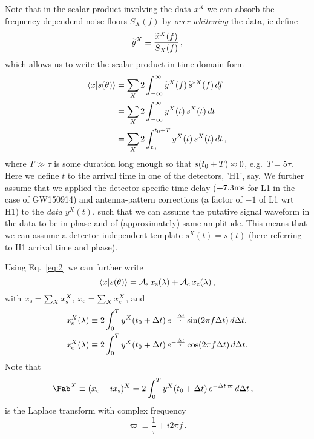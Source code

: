 \documentclass[aps,prd,onecolumn,nofootinbib,superscriptaddress,altaffilletter,floatfix]{revtex4-1}
\begin{document}
Note that in the scalar product involving the data $x^X$ we can absorb the frequency-dependend noise-floors $S_X(f)$ by \emph{over-whitening} the
data, ie define
\begin{equation}
  \label{eq:12}
  \widetilde{y}^X \equiv \frac{\widetilde{x}^X(f)}{S_X(f)}\,,
\end{equation}
which allows us to write the scalar product in time-domain form
\begin{align}
  \label{eq:13}
  \langle x|s(\theta)\rangle &= \sum_X 2\int_{-\infty}^{\infty} \widetilde{y}^X(f)\,\widetilde{s}^{*X}(f)\,df \\
  &= \sum_X 2\int_{-\infty}^{\infty} y^X(t)\,s^X(t)\,dt \\
  &= \sum_X 2\int_{t_0}^{t_0 + T} y^X(t)\,s^X(t)\,dt\,,
\end{align}
where $T \gg \tau$ is some duration long enough so that $s(t_0+T)\approx0$, e.g.\ $T=5\tau$. Here we define $t$ to the arrival time in one of
the detectors, 'H1', say. We further assume that we applied the detector-specific time-delay ($+7.3\mathrm{ms}$ for L1 in the case of GW150914) and
antenna-pattern corrections (a factor of $-1$ of L1 wrt H1) to the \emph{data} $y^X(t)$, such that we can assume the putative signal waveform in the
data to be in phase and of (approximately) same amplitude. This means that we can assume a detector-independent template $s^X(t) = s(t)$ (here
referring to H1 arrival time and phase).

Using Eq.~\eqref{eq:2} we can further write
\begin{equation}
  \label{eq:9}
  \langle x|s(\theta)\rangle = \mathcal{A}_{\mathrm{s}}\,x_{\mathrm{s}}(\lambda) + \mathcal{A}_{\mathrm{c}}\,x_{\mathrm{c}}(\lambda)\,,
\end{equation}
with $x_{\mathrm{s}}=\sum_X x_{\mathrm{s}}^X$, $x_{\mathrm{c}}=\sum_X x_{\mathrm{c}}^X$, and
\begin{align}
  \label{eq:10}
  x_{\mathrm{s}}^X(\lambda) &\equiv 2\int_{0}^{T} y^X(t_0+\Delta t)\,e^{-\frac{\Delta t}{\tau}}\sin(2\pi f\Delta t)\,d\Delta t,\\
  x_{\mathrm{c}}^X(\lambda) &\equiv 2\int_{0}^{T} y^X(t_0+\Delta t)\,e^{-\frac{\Delta t}{\tau}}\cos(2\pi f\Delta t)\,d\Delta t.\\
\end{align}
Note that
\begin{align}
  \label{eq:16}
  \Fab^X \equiv (\xc - i\xs)^X &= 2 \int_{0}^{T} y^X(\tStart+\Dt)\,e^{-\Dt \,\varpi}\,d\Dt\,,
\end{align}
is the Laplace transform with complex frequency
\begin{equation}
  \label{eq:27}
  \varpi \equiv \frac{1}{\tau} + i2\pi f\,.
\end{equation}
\end{document}
